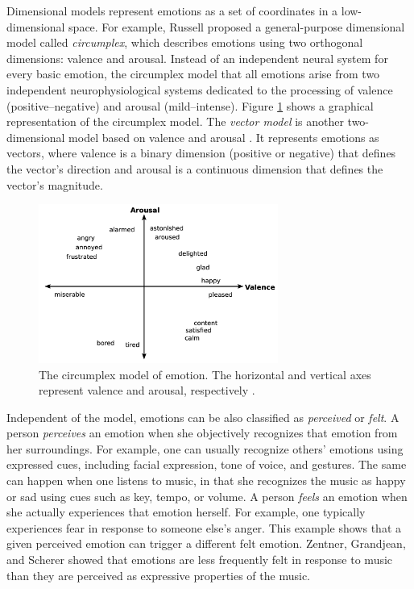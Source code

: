 Dimensional models represent emotions as a set of coordinates in a low-dimensional space. For example, Russell \cite{russell1980circumplex} proposed a general-purpose dimensional model called \textit{circumplex}, which describes emotions using two orthogonal dimensions: valence and arousal. Instead of an independent neural system for every basic emotion, the circumplex model that all emotions arise from two independent neurophysiological systems dedicated to the processing of valence (positive--negative) and arousal (mild--intense). Figure \ref{fig:circumplex} shows a graphical representation of the circumplex model. The \textit{vector model} is another two-dimensional model based on valence and arousal \cite{bradley1992remembering}. It represents emotions as vectors, where valence is a binary dimension (positive or negative) that defines the vector's direction and arousal is a continuous dimension that defines the vector's magnitude.

\begin{figure}[!h]
\centering
\includegraphics[width=0.7\textwidth]{imgs/related_work/circumplex.png}
\caption{The circumplex model of emotion. The horizontal and vertical axes represent valence and arousal,
respectively \cite{russell1980circumplex}.}
\label{fig:circumplex}
\end{figure}

Independent of the model, emotions can be also classified as \textit{perceived} or \textit{felt}.
A person \textit{perceives} an emotion when she objectively recognizes that emotion from her surroundings. For example, one can usually recognize others' emotions using expressed cues, including facial expression, tone of voice, and gestures. The same can happen when one listens to music, in that she recognizes the music as happy or sad using cues such as key, tempo, or volume. A person \textit{feels} an emotion when she actually experiences that emotion herself. For example, one typically experiences fear in response to someone else's anger. This example shows that a given perceived emotion can trigger a different felt emotion. Zentner, Grandjean, and Scherer \cite{zentner2008emotions} showed that emotions are less frequently felt in response to music than they are perceived as expressive properties of the music.


